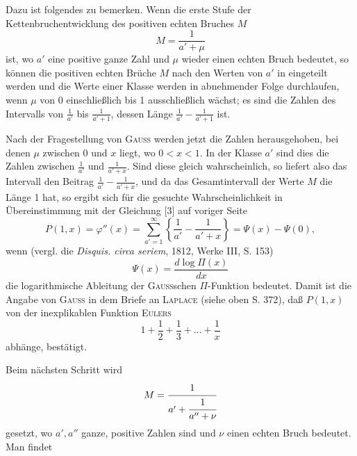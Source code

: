 \par\medskip\begingroup\small
\makeatletter\tagsleft@true\let\veqno\@@leqno\makeatother
\noindent\hspace*{\parindent}Dazu ist folgendes zu bemerken. Wenn die erste Stufe der Kettenbruchentwicklung des positiven echten Bruches \(M\)
\[
M=\frac1{a'+\mu}
\]
\noindent ist, wo \(a'\) eine positive ganze Zahl und \(\mu\) wieder einen echten Bruch bedeutet, so können die positiven echten Brüche \(M\) nach den Werten von \(a'\) in  eingeteilt werden und die Werte einer Klasse werden in abnehmender Folge durchlaufen, wenn \(\mu\) von 0 einschließlich bis 1 ausschließlich wächst; es sind die Zahlen des Intervalls von \(\frac1{a'}\) bis \(\frac1{a'+1}\), dessen Länge \(\frac1{a'}-\frac1{a'+1}\) ist.
\par\noindent\hspace*{\parindent}Nach der Fragestellung von \textsc{Gauss} werden jetzt die Zahlen herausgehoben, bei denen \(\mu\) zwischen 0 und \(x\) liegt, wo \(0<x<1\). In der Klasse \(a'\) sind dies die Zahlen zwischen \(\frac1{a'}\) und \(\frac1{a'+x}\). Sind diese gleich wahrscheinlich, so liefert also das Intervall den Beitrag \(\frac1{a'}-\frac1{a'+x}\), und da das Gesamtintervall der Werte \(M\) die Länge 1 hat, so ergibt sich für die gesuchte Wahrscheinlichkeit in Übereinstimmung mit der Gleichung [3] auf voriger Seite
\begin{equation*}\tag*{(5)}P(1,x)=\varphi''(x)=\sum_{a'=1}^{\infty}\left\{\frac1{a'}-\frac1{a'+x}\right\}=\Psi(x)-\Psi(0),\end{equation*}
\noindent wenn (vergl. die \textit{Disquis. circa seriem}, 1812, Werke III, S. 153)
\[
\Psi(x)=\frac{d\log\Pi(x)}{dx}
\]
\noindent die logarithmische Ableitung der \textsc{Gauss}schen \(\Pi\)-Funktion bedeutet. Damit ist die Angabe von \textsc{Gauss} in dem Briefe an \textsc{Laplace} (siehe oben S. 372), daß \(P(1,x)\) von der inexplikablen Funktion \textsc{Eulers}
\[
1+\frac12+\frac13+\ldots+\frac1x
\]
\noindent abhänge, bestätigt.
\par\noindent\hspace*{\parindent}Beim nächsten Schritt wird
\[
M=\cfrac1{a'+\cfrac1{a''+\nu}}
\]
\noindent gesetzt, wo \(a',a''\) ganze, positive Zahlen sind und \(\nu\) einen echten Bruch bedeutet. Man findet
\par\endgroup

